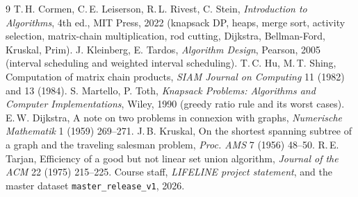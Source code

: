 \documentclass[11pt,a4paper]{article}
\newcommand{\cs}[1]{\texttt{#1}}
\begin{document}
\begin{thebibliography}{9}\small
{} T.\,H. Cormen, C.\,E. Leiserson, R.\,L. Rivest, C. Stein, \emph{Introduction to Algorithms}, 4th ed., MIT Press, 2022 (knapsack DP, heaps, merge sort, activity selection, matrix-chain multiplication, rod cutting, Dijkstra, Bellman-Ford, Kruskal, Prim).
 J. Kleinberg, E. Tardos, \emph{Algorithm Design}, Pearson, 2005 (interval scheduling and weighted interval scheduling).
 T.\,C. Hu, M.\,T. Shing, Computation of matrix chain products, \emph{SIAM Journal on Computing} 11 (1982) and 13 (1984).
 S. Martello, P. Toth, \emph{Knapsack Problems: Algorithms and Computer Implementations}, Wiley, 1990 (greedy ratio rule and its worst cases).
 E.\,W. Dijkstra, A note on two problems in connexion with graphs, \emph{Numerische Mathematik} 1 (1959) 269--271.
 J.\,B. Kruskal, On the shortest spanning subtree of a graph and the traveling salesman problem, \emph{Proc. AMS} 7 (1956) 48--50.
 R.\,E. Tarjan, Efficiency of a good but not linear set union algorithm, \emph{Journal of the ACM} 22 (1975) 215--225.
 Course staff, \emph{LIFELINE project statement}, and the master dataset \cs{master\_release\_v1}, 2026.
\end{thebibliography}
\end{document}
